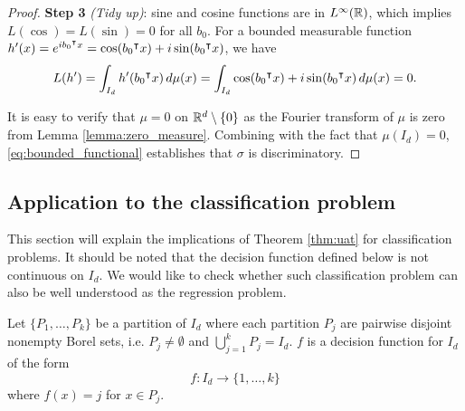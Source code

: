 \begin{proof}
    \textbf{Step 3} \textit{(Tidy up)}: sine and cosine functions are in
    $L^{\infty}(\mathbb{R})$, which implies $L(\cos) = L(\sin) = 0$ for all $b_0$. For a
    bounded measurable function $h'(x) = e^{ib_0{}^{\intercal} x} = \cos(b_0{}^{\intercal} x) + i
    \sin(b_0{}^{\intercal} x)$, we have
    \begin{equation}
        \label{eq:bounded_functional}
        L(h') = \int_{I_d} h'(b_0{}^{\intercal} x) \,d\mu(x) 
              = \int_{I_d} \cos(b_0{}^{\intercal} x) + i \sin(b_0{}^{\intercal} x) \,d\mu(x)
              = 0.
    \end{equation}

    It is easy to verify that $\mu = 0$ on $\mathbb{R}^d \setminus \{0\}$ as the Fourier
    transform of $\mu$ is zero from Lemma \ref{lemma:zero_measure}. Combining
    with the fact that $\mu(I_d) = 0$, \eqref{eq:bounded_functional} establishes
    that $\sigma$ is discriminatory.

\end{proof}





\subsection{Application to the classification problem}

This section will explain the implications of Theorem \ref{thm:uat} for
classification problems. It should be noted that the decision function defined
below is not continuous on $I_d$. We would like to check whether such
classification problem can also be well understood as the regression problem.

\begin{definition}
    Let $\{P_1, \dots, P_k\}$ be a partition of $I_d$ where each partition $P_j$
    are pairwise disjoint nonempty Borel sets, i.e. $P_j \not= \emptyset$ and
    $\bigcup_{j=1}^k P_j = I_d$. $f$ is a decision function for $I_d$ of the
    form
    \begin{equation}
        f: I_d \to \{1, \dots, k\}
    \end{equation}
    where $f(x) = j$ for $x \in P_j$. 
\end{definition}

